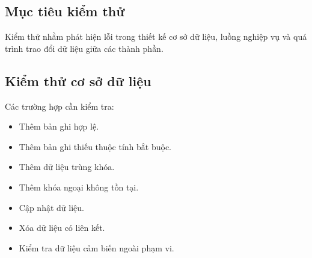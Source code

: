 
\subsection{Mục tiêu kiểm thử}
Kiểm thử nhằm phát hiện lỗi trong thiết kế cơ sở dữ liệu, luồng nghiệp vụ và quá trình trao đổi dữ liệu giữa các thành phần.

\subsection{Kiểm thử cơ sở dữ liệu}
Các trường hợp cần kiểm tra:
\begin{itemize}
    \item Thêm bản ghi hợp lệ.
    \item Thêm bản ghi thiếu thuộc tính bắt buộc.
    \item Thêm dữ liệu trùng khóa.
    \item Thêm khóa ngoại không tồn tại.
    \item Cập nhật dữ liệu.
    \item Xóa dữ liệu có liên kết.
    \item Kiểm tra dữ liệu cảm biến ngoài phạm vi.
\end{itemize}




